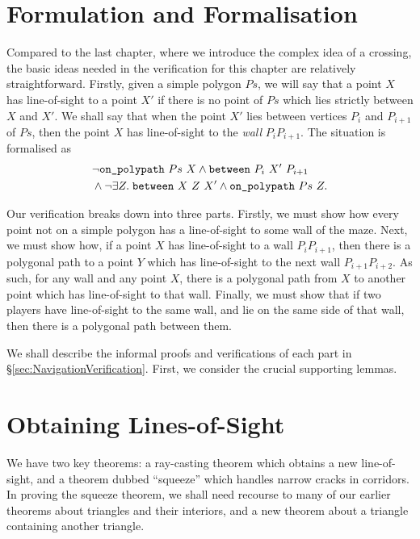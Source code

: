 \section{Formulation and Formalisation}\label{sec:Jordan2Formulation}
Compared to the last chapter, where we introduce the complex idea of a crossing, the basic ideas needed in the verification for this chapter are relatively straightforward. Firstly, given a simple polygon $Ps$, we will say that a point $X$ has line-of-sight to a point $X'$ if there is no point of $Ps$ which lies strictly between $X$ and $X'$. We shall say that when the point $X'$ lies between vertices $P_i$ and $P_{i+1}$ of $Ps$, then the point $X$ has line-of-sight to the \emph{wall} $P_iP_{i+1}$. The situation is formalised as
\begin{displaymath}
  \begin{aligned}
    &\neg\texttt{on\_polypath}\ Ps\ X \wedge \texttt{between}\ P_i\ X'\ P_{i+1}\\
    &\wedge \neg\exists Z.\; \texttt{between}\ X\ Z\ X' \wedge \texttt{on\_polypath}\ Ps\ Z.
  \end{aligned}
\end{displaymath}

Our verification breaks down into three parts. Firstly, we must show how every point not on a simple polygon has a line-of-sight to some wall of the maze. Next, we must show how, if a point $X$ has line-of-sight to a wall $P_iP_{i+1}$, then there is a polygonal path to a point $Y$ which has line-of-sight to the next wall $P_{i+1}P_{i+2}$. As such, for any wall and any point $X$, there is a polygonal path from $X$ to another point which has line-of-sight to that wall. Finally, we must show that if two players have line-of-sight to the same wall, and lie on the same side of that wall, then there is a polygonal path between them.

We shall describe the informal proofs and verifications of each part in \S\ref{sec:NavigationVerification}. First, we consider the crucial supporting lemmas.

\section{Obtaining Lines-of-Sight}\label{sec:Jordan2Lemmas}
We have two key theorems: a ray-casting theorem which obtains a new line-of-sight, and a theorem dubbed ``squeeze'' which handles narrow cracks in corridors. In proving the squeeze theorem, we shall need recourse to many of our earlier theorems about triangles and their interiors, and a new theorem about a triangle containing another triangle.

